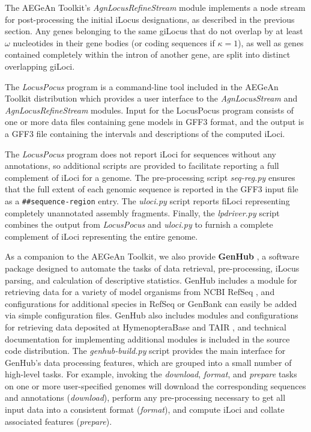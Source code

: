 The AEGeAn Toolkit's \textit{AgnLocusRefineStream} module implements a node stream for post-processing the initial iLocus designations, as described in the previous section.
Any genes belonging to the same giLocus that do not overlap by at least $\omega$ nucleotides in their gene bodies (or coding sequences if $\kappa = 1$), as well as genes contained completely within the intron of another gene, are split into distinct overlapping giLoci.

The \textit{LocusPocus} program is a command-line tool included in the AEGeAn Toolkit distribution which provides a user interface to the \textit{AgnLocusStream} and \textit{AgnLocusRefineStream} modules.
Input for the LocusPocus program consists of one or more data files containing gene models in GFF3 format, and the output is a GFF3 file containing the intervals and descriptions of the computed iLoci.

The \textit{LocusPocus} program does not report iLoci for sequences without any annotations, so additional scripts are provided to facilitate reporting a full complement of iLoci for a genome.
The pre-processing script \textit{seq-reg.py} ensures that the full extent of each genomic sequence is reported in the GFF3 input file as a \texttt{\#\#sequence-region} entry.
The \textit{uloci.py} script reports fiLoci representing completely unannotated assembly fragments.
Finally, the \textit{lpdriver.py} script combines the output from \textit{LocusPocus} and \textit{uloci.py} to furnish a complete complement of iLoci representing the entire genome.

As a companion to the AEGeAn Toolkit, we also provide \textbf{GenHub} \cite{GenHub}, a software package designed to automate the tasks of data retrieval, pre-processing, iLocus parsing, and calculation of descriptive statistics.
GenHub includes a module for retrieving data for a variety of model organisms from NCBI RefSeq \cite{RefSeq}, and configurations for additional species in RefSeq or GenBank can easily be added via simple configuration files.
GenHub also includes modules and configurations for retrieving data deposited at HymenopteraBase \cite{HymBase} and TAIR \cite{TAIR}, and technical documentation for implementing additional modules is included in the source code distribution.
The \textit{genhub-build.py} script provides the main interface for GenHub's data processing features, which are grouped into a small number of high-level tasks.
For example, invoking the \textit{download}, \textit{format}, and \textit{prepare} tasks on one or more user-specified genomes will download the corresponding sequences and annotations (\textit{download}), perform any pre-processing necessary to get all input data into a consistent format (\textit{format}), and compute iLoci and collate associated features (\textit{prepare}).


